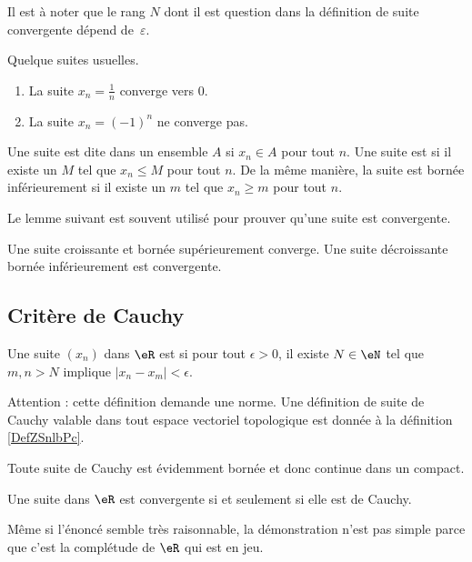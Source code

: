 Il est à noter que le rang $N$ dont il est question dans la définition de suite convergente dépend de~$\varepsilon$.

\begin{example}
	Quelque suites usuelles.
	\begin{enumerate}
		\item
			La suite $x_n=\frac{1}{ n }$ converge vers $0$.
		\item
			La suite $x_n=(-1)^n$ ne converge pas.
	\end{enumerate}
\end{example}

Une suite est dite  dans un ensemble $A$ si $x_n\in A$ pour tout $n$. Une suite est  si il existe un $M$ tel que $x_n\leq M$ pour tout $n$. De la même manière, la suite est bornée inférieurement si il existe un $m$ tel que $x_n\geq m$ pour tout $n$.

Le lemme suivant est souvent utilisé pour prouver qu'une suite est convergente.
\begin{lemma}		\label{LemSuiteCrBorncv}
	Une suite croissante et bornée supérieurement converge. Une suite décroissante bornée inférieurement est convergente.
\end{lemma}

\subsection{Critère de Cauchy}

\begin{definition}
    Une suite \( (x_n)\) dans \( \eR\) est  si pour tout \( \epsilon>0\), il existe \( N\in \eN\) tel que \( m,n>N\) implique \( | x_n-x_m |<\epsilon\).
\end{definition}
Attention : cette définition demande une norme. Une définition de suite de Cauchy valable dans tout espace vectoriel topologique est donnée à la définition \ref{DefZSnlbPc}.

Toute suite de Cauchy est évidemment bornée et donc continue dans un compact.

\begin{theorem} \label{ThoTFGioqS}
    Une suite dans \( \eR\) est convergente si et seulement si elle est de Cauchy.
\end{theorem}
Même si l'énoncé semble très raisonnable, la démonstration n'est pas simple parce que c'est la complétude de \( \eR\) qui est en jeu.

